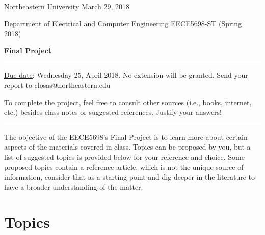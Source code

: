 \documentclass[11pt]{article}
\begin{document}
\noindent Northeastern University
\hfill March 29, 2018

\noindent Department of Electrical and Computer Engineering
\hfill EECE5698-ST (Spring 2018)

\noindent {} \hfill \textbf{Final Project}

\noindent \rule{\linewidth}{1.5pt}

\vspace*{.5cm}

\underline{Due date}: Wednesday 25, April 2018. No extension will be granted. Send your report to closas@northeastern.edu

To complete the project, feel free to consult other sources (i.e., books, internet, etc.) besides class notes or suggested references. Justify your answers!

\noindent \rule{\linewidth}{1pt}
\vspace*{.15cm}

The objective of the EECE5698's Final Project is to learn more about certain aspects of the materials covered in class. Topics can be proposed by you, but a list of suggested topics is provided below for your reference and choice.  Some proposed topics contain a reference article, which is not the unique source of information, consider that as a starting point and dig deeper in the literature to have a broader understanding of the matter. 

\section*{Topics}
\end{document}

